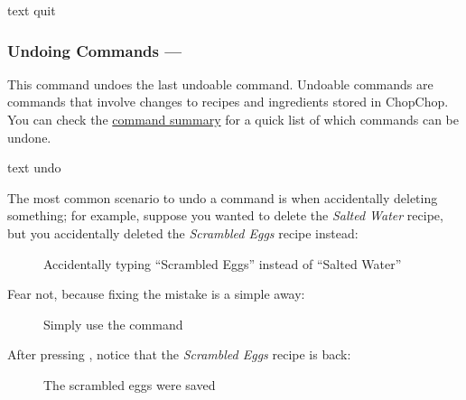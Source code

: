 	 \begin{blockofcode}{text}
		quit
	\end{blockofcode}




\hypertarget{UndoCommand}{}
\subsubsection{Undoing Commands — \texttt{}}

	This command undoes the last undoable command. Undoable commands are commands that involve changes to recipes and ingredients stored in ChopChop. You can check the \hyperlink{CommandSummary}{command summary} for a quick list of which commands can be undone.

	 \begin{blockofcode}{text}
		undo
	\end{blockofcode}

	The most common scenario to undo a command is when accidentally deleting something; for example, suppose you wanted to delete the
	\emph{Salted Water} recipe, but you accidentally deleted the \emph{Scrambled Eggs} recipe instead:

	\begin{figure}[!htbp]\centering\ContinuedFloat*
		\caption{Accidentally typing \enquote{Scrambled Eggs} instead of \enquote{Salted Water}}
	\end{figure}

	\pagebreak
	Fear not, because fixing the mistake is a simple  away:
	\vspace{-0.5em}

	\begin{figure}[!htbp]\centering\ContinuedFloat
		\caption{Simply use the  command}
	\end{figure}
	\vspace{-1.5em}

	After pressing , notice that the \emph{Scrambled Eggs} recipe is back:
	\vspace{-0.5em}

	\begin{figure}[!htbp]\centering\ContinuedFloat
		\caption{The scrambled eggs were saved}
	\end{figure}
	\vspace{-2em} %

